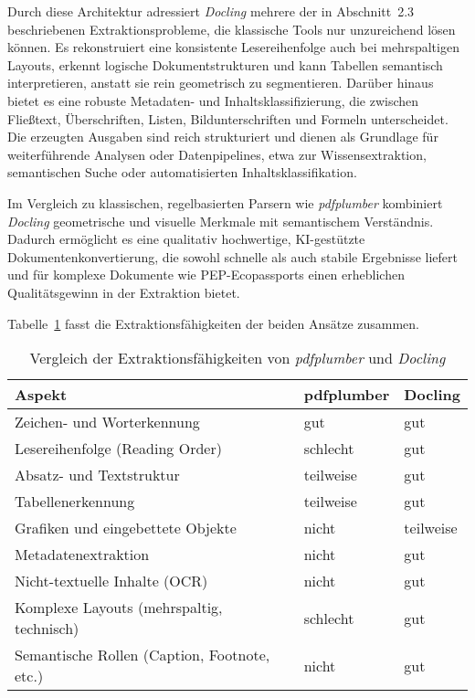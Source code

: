 Durch diese Architektur adressiert \emph{Docling} mehrere der in Abschnitt~2.3 beschriebenen Extraktionsprobleme, die klassische Tools nur unzureichend lösen können. 
Es rekonstruiert eine konsistente Lesereihenfolge auch bei mehrspaltigen Layouts, erkennt logische Dokumentstrukturen und kann Tabellen semantisch 
interpretieren, anstatt sie rein geometrisch zu segmentieren.  \cite{Auer2025}
Darüber hinaus bietet es eine robuste Metadaten- und Inhaltsklassifizierung, die zwischen Fließtext, Überschriften, Listen, 
Bildunterschriften und Formeln unterscheidet. 
Die erzeugten Ausgaben sind reich strukturiert und dienen als Grundlage für weiterführende Analysen oder Datenpipelines, etwa zur Wissensextraktion, 
semantischen Suche oder automatisierten Inhaltsklassifikation. \cite{Auer2024}

Im Vergleich zu klassischen, regelbasierten Parsern wie \emph{pdfplumber} kombiniert \emph{Docling} geometrische und visuelle Merkmale mit semantischem Verständnis. 
Dadurch ermöglicht es eine qualitativ hochwertige, KI-gestützte Dokumentenkonvertierung, die sowohl schnelle 
als auch stabile Ergebnisse liefert und für komplexe Dokumente wie PEP-Ecopassports einen erheblichen Qualitätsgewinn in der Extraktion bietet. \cite{Auer2024}

Tabelle~\ref{tab:extraktion_vergleich} fasst die Extraktionsfähigkeiten der beiden Ansätze zusammen. 

\begin{table}[h!]
\centering
\caption{Vergleich der Extraktionsfähigkeiten von \textit{pdfplumber} und \textit{Docling}}
\label{tab:extraktion_vergleich}
\begin{tabular}{p{5cm}p{3cm}p{3cm}}
\hline
\textbf{Aspekt} & \textbf{pdfplumber} & \textbf{Docling} \\
\hline
Zeichen- und Worterkennung & gut & gut \\
Lesereihenfolge (Reading Order) & schlecht & gut \\
Absatz- und Textstruktur & teilweise & gut \\
Tabellenerkennung & teilweise & gut \\
Grafiken und eingebettete Objekte & nicht & teilweise \\
Metadatenextraktion & nicht & gut \\
Nicht-textuelle Inhalte (OCR) & nicht & gut \\
Komplexe Layouts (mehrspaltig, technisch) & schlecht & gut \\
Semantische Rollen (Caption, Footnote, etc.) & nicht & gut \\
\hline
\end{tabular}
\end{table}






